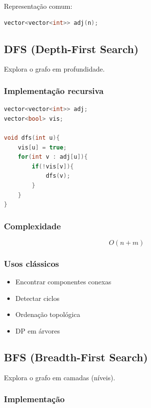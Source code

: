 \documentclass[11pt]{article}
\begin{document}
Representação comum:
\begin{lstlisting}[language=C++]
vector<vector<int>> adj(n);
\end{lstlisting}

\subsection{DFS (Depth-First Search)}

Explora o grafo em profundidade.

\subsubsection{Implementação recursiva}

\begin{lstlisting}[language=C++]
vector<vector<int>> adj;
vector<bool> vis;

void dfs(int u){
    vis[u] = true;
    for(int v : adj[u]){
        if(!vis[v]){
            dfs(v);
        }
    }
}
\end{lstlisting}

\subsubsection{Complexidade}

\[
O(n + m)
\]

\subsubsection{Usos clássicos}

\begin{itemize}
    \item Encontrar componentes conexas
    \item Detectar ciclos
    \item Ordenação topológica
    \item DP em árvores
\end{itemize}

\subsection{BFS (Breadth-First Search)}

Explora o grafo em camadas (níveis).

\subsubsection{Implementação}
\end{document}
